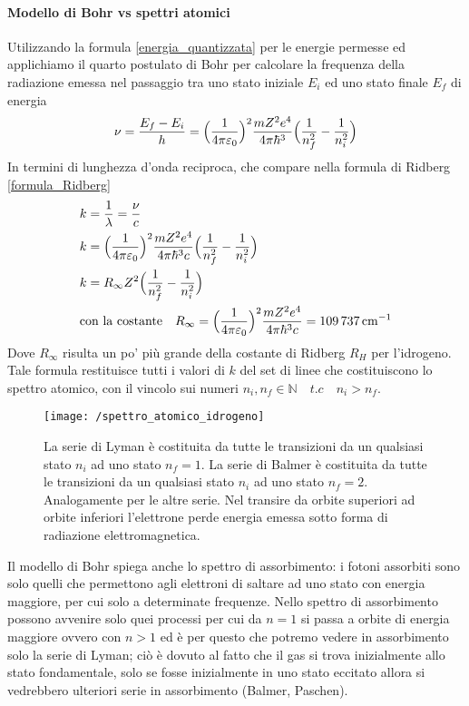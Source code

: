 \paragraph{Modello di Bohr vs spettri atomici}
Utilizzando la formula \ref{energia_quantizzata} per le energie permesse ed applichiamo il quarto postulato di Bohr per calcolare la frequenza della radiazione emessa nel passaggio tra uno stato iniziale $E_i$ ed uno stato finale $E_f$ di energia
\begin{equation}
\nu = \frac{ E_f - E_i}{h } = \Bigl(  \frac{ 1}{4 \pi \varepsilon_0 }  \Bigr)^2 \frac{ m Z^2 e^4}{4\pi \hbar^3 } \Bigl(  \frac{ 1}{n_f^2 } - \frac{ 1}{n_i^2 }  \Bigr)
\end{equation}
In termini di lunghezza d'onda reciproca, che compare nella formula di Ridberg \ref{formula_Ridberg}
\begin{equation}
\begin{split}
& k = \frac{ 1}{\lambda } = \frac{ \nu}{c } \\
& k = \Bigl(  \frac{ 1}{4 \pi \varepsilon_0 }  \Bigr)^2 \frac{ m Z^2 e^4}{4\pi \hbar^3 c} \Bigl(  \frac{ 1}{n_f^2 } - \frac{ 1}{n_i^2 }  \Bigr) \\
& k = R_{\infty} Z^2 \Bigl(  \frac{ 1}{n_f^2 } - \frac{ 1}{n_i^2 }  \Bigr) \\
& \mbox{con la costante} \quad R_{\infty} = \Bigl(  \frac{ 1}{4 \pi \varepsilon_0 }  \Bigr)^2 \frac{ m Z^2 e^4}{4\pi \hbar^3 c} = \SI{109737}{cm^{-1}}
\end{split}
\end{equation}
Dove $R_{\infty}$ risulta un po' più grande della costante di Ridberg $R_H$ per l'idrogeno.
Tale formula restituisce tutti i valori di $k$ del set di linee che costituiscono lo spettro atomico, con il vincolo sui numeri $n_i, n_f \in \mathbb{N} \quad t.c \quad n_i > n_f$.
\begin{figure}[h]
\centering
\texttt{[image: /spettro\_atomico\_idrogeno]}
\caption{La serie di Lyman è costituita da tutte le transizioni da un qualsiasi stato $n_i$ ad uno stato $n_f = 1$.
La serie di Balmer è costituita da tutte le transizioni da un qualsiasi stato $n_i$ ad uno stato $n_f = 2$.
Analogamente per le altre serie.
Nel transire da orbite superiori ad orbite inferiori l'elettrone perde energia emessa sotto forma di radiazione elettromagnetica.}
\end{figure}
Il modello di Bohr spiega anche lo spettro di assorbimento: i fotoni assorbiti sono solo quelli che permettono agli elettroni di saltare ad uno stato con energia maggiore, per cui solo a determinate frequenze.
Nello spettro di assorbimento possono avvenire solo quei processi per cui da $n=1$ si passa a orbite di energia maggiore ovvero con $n>1$ ed è per questo che potremo vedere in assorbimento solo la serie di Lyman;
ciò è dovuto al fatto che il gas si trova inizialmente allo stato fondamentale, solo se fosse inizialmente in uno stato eccitato allora si vedrebbero ulteriori serie in assorbimento (Balmer, Paschen).

